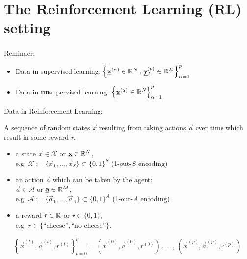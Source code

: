 \section{The Reinforcement Learning (RL) setting}



\begin{frame}\frametitle{\secname}

Reminder:
\begin{itemize}
\item Data in supervised learning:
$
\Big\{
	\underline{\mathbf{x}}^{(\alpha)} \in \mathbb{R}^N
	\,,\,
	\underline{\mathbf{y}}_T^{(p)} \in \mathbb{R}^M
\Big\}_{\alpha=1}^{p}
$

\item Data in \textbf{un}supervised learning:
$
\Big\{
	\underline{\mathbf{x}}^{(\alpha)} \in \mathbb{R}^N
\Big\}_{\alpha=1}^{p}
$\\

\end{itemize}

Data in Reinforcement Learning:

A sequence of random states $\vec x$ resulting from taking actions $\vec a$ over time which result in some reward $r$.

\pause

\begin{itemize}
\item a state $\vec x \in \mathcal{X}$ or $\underline{\mathbf{x}} \in \mathbb{R}^N$,\\
e.g. $\mathcal{X} := \{ \vec x_1, \ldots, \vec x_S\} \subset \{0,1\}^S$ (1-out-$S$ encoding)
\pause
\item an action $\vec a$ which can be taken by the agent:\\

$\vec a \in \mathcal{A}$ or $\underline{\mathbf{a}} \in \mathbb{R}^M$,\\
 e.g. $\mathcal{A} := \{ \vec a_1, \ldots, \vec a_A\} \subset \{0,1\}^A$ (1-out-$A$ encoding)
\pause
\item a reward $r \in \mathbb{R}$ or $r \in \{0,1\}$,\\
 e.g. $r \in \{\text{``cheese''},\text{``no cheese''}\}$.

\end{itemize}
\pause
{}

\slidesonly{\vspace{-4mm}}

\begin{align}
\label{eq:chain}
\left\{\vec x^{(t)}, \vec a^{(t)}, r^{(t)}\right\}_{t=0}^{p} = 
\left( \vec x^{(0)}, \vec a^{(0)}, r^{(0)} \right) \,,\, \ldots \,,\, \left(\vec x^{(p)}, \vec a^{(p)}, r^{(p)} \right)
\end{align}


\end{frame}

